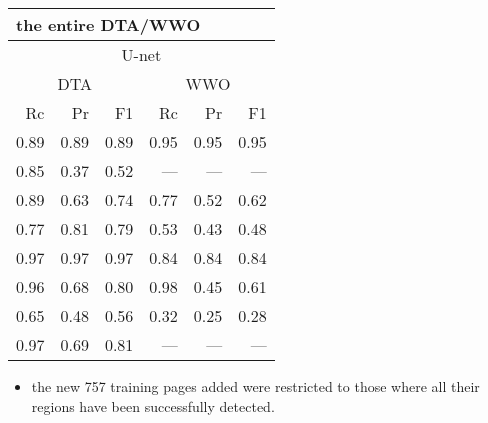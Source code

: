 {\begin{center}
\begin{tabular}[t]{rrr|rrr}
      \bottomrule
    \end{tabular}%
    \begin{tabular}[t]{|rrr|rrr}
      \multicolumn{6}{l}{\scriptsize\!the entire DTA/WWO} \\[.2em]
      \toprule
              \multicolumn{6}{|c}{U-net} \\
              \multicolumn{3}{|c}{DTA} & \multicolumn{3}{c}{WWO} \\
                  Rc &   Pr &   F1 &   Rc &   Pr &   F1 \\
      \midrule
      \rowcolor{LightCyan}
                0.89 & 0.89 & 0.89 & 0.95 & 0.95 & 0.95 \\
                0.85 & 0.37 & 0.52 &  --- &  --- &  --- \\ 
      \rowcolor{LightCyan}     
                0.89 & 0.63 & 0.74 & 0.77 & 0.52 & 0.62 \\
                0.77 & 0.81 & 0.79 & 0.53 & 0.43 & 0.48 \\
      \rowcolor{LightCyan}           
                0.97 & 0.97 & 0.97 & 0.84 & 0.84 & 0.84 \\
                0.96 & 0.68 & 0.80 & 0.98 & 0.45 & 0.61 \\
      \rowcolor{LightCyan}      
                0.65 & 0.48 & 0.56 & 0.32 & 0.25 & 0.28 \\
                0.97 & 0.69 & 0.81 &  --- &  --- &  --- \\ 
      \bottomrule
    \end{tabular}%
  \end{center}
  
  \begin{itemize}
    \itemsep=-.0em
    \small 
    \setlength{\leftskip}{-1.5em}
    
  \item {} the new 757 training pages added were restricted to those where all their regions have been successfully detected.
  \end{itemize}

}
